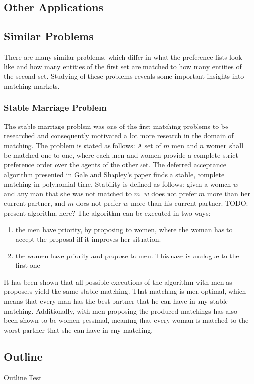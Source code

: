 \subsection{Other Applications}

\subsection{Similar Problems}
There are many similar problems, which differ in what the preference lists look like and how many entities of the first set are matched to how many entities of the second set. Studying of these problems reveals some important insights into matching markets.

\subsubsection{Stable Marriage Problem}
The stable marriage problem was one of the first matching problems to be researched\cite{GaleShapleyOrig} and consequently motivated a lot more research in the domain of matching.
\newline
The problem is stated as follows: A set of $m$ men and $n$ women shall be matched one-to-one, where each men and women provide a complete strict-preference order over the agents of the other set. The deferred acceptance algorithm presented in Gale and Shapley's paper\cite{GaleShapleyOrig}
finds a stable, complete matching in polynomial time. Stability is defined as follows: given a women $w$ and any man that she was not matched to $m$, $w$ does not prefer $m$ more than her current partner, and $m$ does not prefer $w$ more than his current partner. 
\newline
TODO: present algorithm here?
\newline
The algorithm can be executed in two ways: 
\begin{enumerate}
    \item the men have priority, by proposing to women, where the woman has to accept the proposal iff it improves her situation.  
    \item the women have priority and propose to men. This case is analogue to the first one
\end{enumerate}
It has been shown that all possible executions of the algorithm with men as proposers yield the same stable matching. That matching is men-optimal, which means that every man has the best partner that he can have in any stable matching.\cite{Gusfield} Additionally, with men proposing the produced matchings has also been shown to be women-pessimal, meaning that every woman is matched to the worst partner that she can have in any matching.\cite{Gusfield}


\subsection{Outline}
Outline Test
